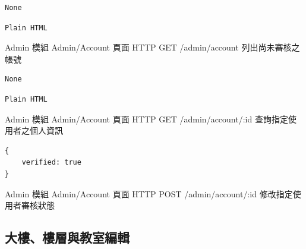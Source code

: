 \documentclass{article}
\begin{document}
\bigskip

\begin{lrbox}{\jsoninputbox}
	\begin{lstlisting}
None
\end{lstlisting}
\end{lrbox}

\begin{lrbox}{\jsonoutputbox}
	\begin{lstlisting}
Plain HTML
\end{lstlisting}
\end{lrbox}

{Admin 模組}
{Admin/Account 頁面}
{HTTP GET}
{/admin/account}
{列出尚未審核之帳號}

\bigskip

\begin{lrbox}{\jsoninputbox}
	\begin{lstlisting}
None
\end{lstlisting}
\end{lrbox}

\begin{lrbox}{\jsonoutputbox}
	\begin{lstlisting}
Plain HTML
\end{lstlisting}
\end{lrbox}

{Admin 模組}
{Admin/Account 頁面}
{HTTP GET}
{/admin/account/:id}
{查詢指定使用者之個人資訊}

\bigskip

\begin{lrbox}{\jsoninputbox}
	\begin{lstlisting}
{
	verified: true
}
\end{lstlisting}
\end{lrbox}

\begin{lrbox}{\jsonoutputbox}
\end{lrbox}

{Admin 模組}
{Admin/Account 頁面}
{HTTP POST}
{/admin/account/:id}
{修改指定使用者審核狀態}

\pagebreak

\subsection{大樓、樓層與教室編輯}
\end{document}
